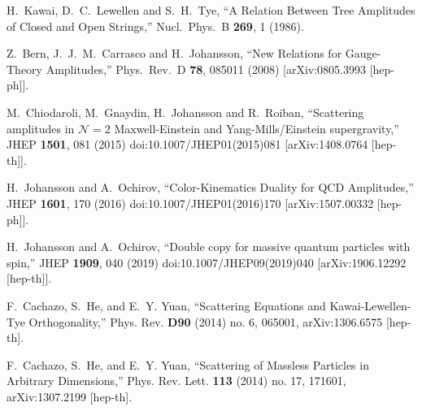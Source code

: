 \documentclass[preprint,showpacs,onecolumn,nofootinbib]{revtex4}
\begin{document}
\begin{thebibliography}{}

  H.~Kawai, D.~C.~Lewellen and S.~H.~Tye,
  ``A Relation Between Tree Amplitudes of Closed and Open Strings,''
  Nucl.\ Phys.\ B {\bf 269}, 1 (1986).

  Z.~Bern, J.~J.~M.~Carrasco and H.~Johansson,
  ``New Relations for Gauge-Theory Amplitudes,''
  Phys.\ Rev.\ D {\bf 78}, 085011 (2008)
  [arXiv:0805.3993 [hep-ph]].

  M.~Chiodaroli, M.~Gnaydin, H.~Johansson and R.~Roiban,
  ``Scattering amplitudes in $ \mathcal{N}=2 $ Maxwell-Einstein and Yang-Mills/Einstein supergravity,''
  JHEP {\bf 1501}, 081 (2015)
  doi:10.1007/JHEP01(2015)081
  [arXiv:1408.0764 [hep-th]].

  H.~Johansson and A.~Ochirov,
  ``Color-Kinematics Duality for QCD Amplitudes,''
  JHEP {\bf 1601}, 170 (2016)
  doi:10.1007/JHEP01(2016)170
  [arXiv:1507.00332 [hep-ph]].

  H.~Johansson and A.~Ochirov,
  ``Double copy for massive quantum particles with spin,''
  JHEP {\bf 1909}, 040 (2019)
  doi:10.1007/JHEP09(2019)040
  [arXiv:1906.12292 [hep-th]].


F.~Cachazo, S.~He, and E.~Y. Yuan,
``{Scattering Equations and Kawai-Lewellen-Tye Orthogonality},''
 { Phys. Rev.} {\bf
  D90} (2014) no. 6, 065001,
{ arXiv:1306.6575 [hep-th]}.

F.~Cachazo, S.~He, and E.~Y. Yuan,
``{Scattering of Massless Particles in Arbitrary Dimensions},''
  { Phys. Rev.
  Lett.} {\bf 113} (2014) no. 17, 171601,
 arXiv:1307.2199 [hep-th].


\end{thebibliography}
\end{document}
